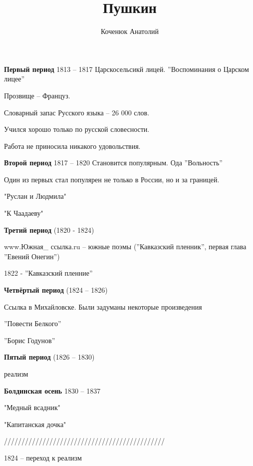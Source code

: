 \documentclass[12pt,a4paper]{article}
\author{Коченюк Анатолий}
\title{Пушкин}
\begin{document}
\maketitle

\textbf{Первый период} 1813 -- 1817
Царскосельсикй лицей. ''Воспоминания о Царском лицее''

Прозвище -- Француз. 

Словарный запас Русского языка -- 26 000 слов.

Учился хорошо только по русской словесности.

Работа не приносила никакого удовольствия.




\textbf{Второй период} 1817 -- 1820
Становится популярным. Ода ''Вольность''

Один из первых стал популярен не только в России, но и за границей.

"Руслан и Людмила"

"К Чаадаеву"



\textbf{Третий период} (1820 - 1824)

www.Южная\_ ссылка.ru -- южные поэмы (''Кавказский пленник'', первая глава ''Евений Онегин'')

1822 - ''Кавказский пленние''

\textbf{Четвёртый период} (1824 -- 1826)

Ссылка в Михайловске. Были задуманы некоторые произведения

''Повести Белкого''

''Борис Годунов''

\textbf{Пятый период} (1826 -- 1830)

реализм

\textbf{Болдинская осень} 1830 -- 1837

"Медный всадник"

"Капитанская дочка"




//////////////////////////////////////////////

1824 -- переход к реализм
\end{document}
